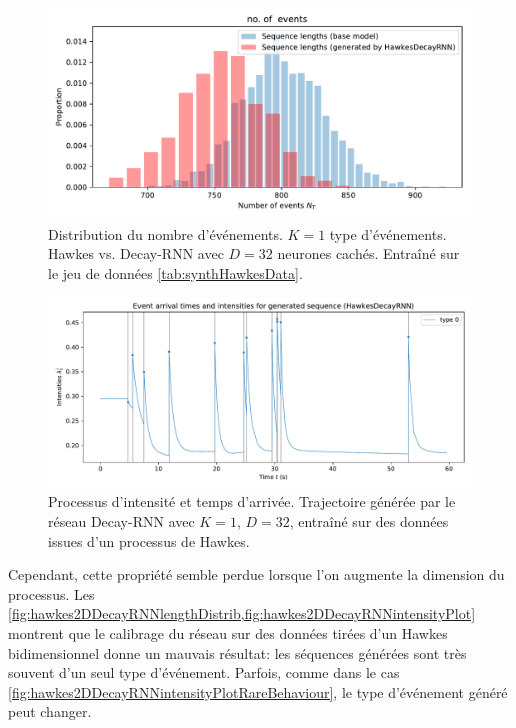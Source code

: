 \documentclass[../main.tex]{subfiles}
\begin{document}
\begin{figure}[htp]
	\includegraphics[width=\linewidth]{../results/seq_length_distrib_HawkesDecayRNN-1d-hidden_32-20181205-143543.pdf}
	\caption{Distribution du nombre d'événements. $K=1$ type d'événements. Hawkes vs. Decay-RNN avec $D=32$ neurones cachés. Entraîné sur le jeu de données \autoref{tab:synthHawkesData}.}\label{fig:hawkes1DDecayRNNlengthDistrib}
\end{figure}

\begin{figure}[htp]
	\includegraphics[width=\linewidth]{../results/intensity_HawkesDecayRNN_1d_hidden32_20181205-143543.pdf}
	\caption{Processus d'intensité et temps d'arrivée. Trajectoire générée par le réseau Decay-RNN avec $K=1$, $D=32$, entraîné sur des données issues d'un processus de Hawkes.}\label{fig:hawkes1DRNNintensityPlot}
\end{figure}

Cependant, cette propriété semble perdue lorsque l'on augmente la dimension du processus. Les \cref{fig:hawkes2DDecayRNNlengthDistrib,fig:hawkes2DDecayRNNintensityPlot} montrent que le calibrage du réseau sur des données tirées d'un Hawkes bidimensionnel donne un mauvais résultat: les séquences générées sont très souvent d'un seul type d'événement. Parfois, comme dans le cas \cref{fig:hawkes2DDecayRNNintensityPlotRareBehaviour}, le type d'événement généré peut changer.
\end{document}
